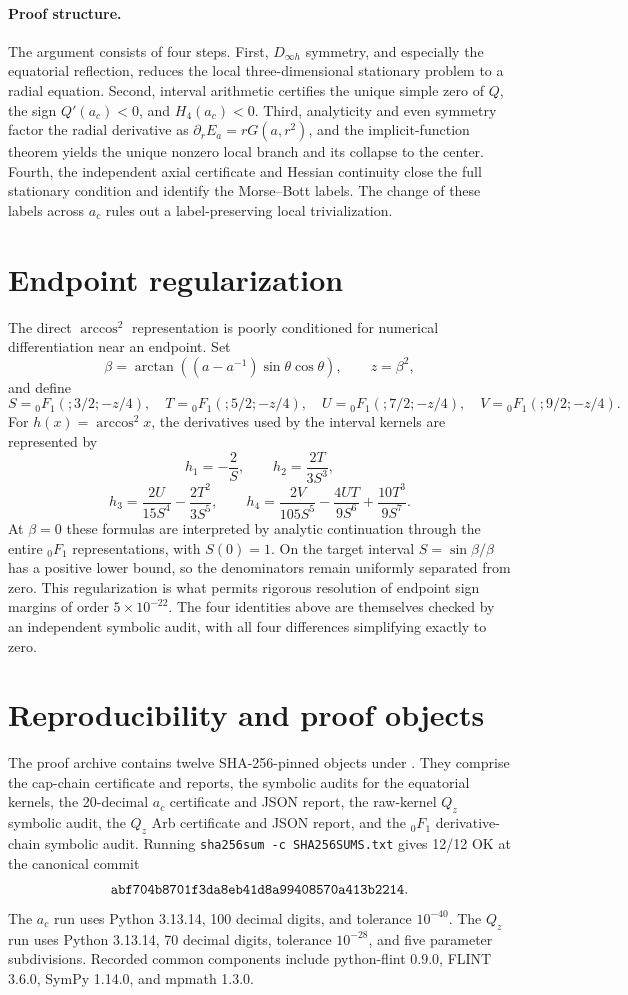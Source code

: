 \documentclass[11pt]{article}
\begin{document}
\paragraph{Proof structure.}
The argument consists of four steps. First, $D_{\infty h}$ symmetry, and especially the equatorial reflection, reduces the local three-dimensional stationary problem to a radial equation. Second, interval arithmetic certifies the unique simple zero of $Q$, the sign $Q'(a_c)<0$, and $H_4(a_c)<0$. Third, analyticity and even symmetry factor the radial derivative as $\partial_rE_a=rG(a,r^2)$, and the implicit-function theorem yields the unique nonzero local branch and its collapse to the center. Fourth, the independent axial certificate and Hessian continuity close the full stationary condition and identify the Morse--Bott labels. The change of these labels across $a_c$ rules out a label-preserving local trivialization.

\section{Endpoint regularization}
The direct $\arccos^2$ representation is poorly conditioned for numerical differentiation near an endpoint. Set
\[
\beta=\arctan((a-a^{-1})\sin\theta\cos\theta),\qquad z=\beta^2,
\]
and define
\[
S={}_0F_1(;3/2;-z/4),\quad T={}_0F_1(;5/2;-z/4),\quad U={}_0F_1(;7/2;-z/4),\quad V={}_0F_1(;9/2;-z/4).
\]
For $h(x)=\arccos^2x$, the derivatives used by the interval kernels are represented by
\[
h_1=-\frac2S,\qquad h_2=\frac{2T}{3S^3},
\]
\[
h_3=\frac{2U}{15S^4}-\frac{2T^2}{3S^5},\qquad
h_4=\frac{2V}{105S^5}-\frac{4UT}{9S^6}+\frac{10T^3}{9S^7}.
\]
At $\beta=0$ these formulas are interpreted by analytic continuation through the entire ${}_0F_1$ representations, with $S(0)=1$. On the target interval $S=\sin\beta/\beta$ has a positive lower bound, so the denominators remain uniformly separated from zero. This regularization is what permits rigorous resolution of endpoint sign margins of order $5\times10^{-22}$. The four identities above are themselves checked by an independent symbolic audit, with all four differences simplifying exactly to zero.

\section{Reproducibility and proof objects}\label{sec:repro}
The proof archive contains twelve SHA-256-pinned objects under . They comprise the cap-chain certificate and reports, the symbolic audits for the equatorial kernels, the 20-decimal $a_c$ certificate and JSON report, the raw-kernel $Q_z$ symbolic audit, the $Q_z$ Arb certificate and JSON report, and the ${}_0F_1$ derivative-chain symbolic audit. Running \texttt{sha256sum -c SHA256SUMS.txt} gives 12/12 OK at the canonical commit
\[
\texttt{abf704b8701f3da8eb41d8\allowbreak a99408570a413b2214}.
\]
The $a_c$ run uses Python 3.13.14, 100 decimal digits, and tolerance $10^{-40}$. The $Q_z$ run uses Python 3.13.14, 70 decimal digits, tolerance $10^{-28}$, and five parameter subdivisions. Recorded common components include python-flint 0.9.0, FLINT 3.6.0, SymPy 1.14.0, and mpmath 1.3.0.
\end{document}

